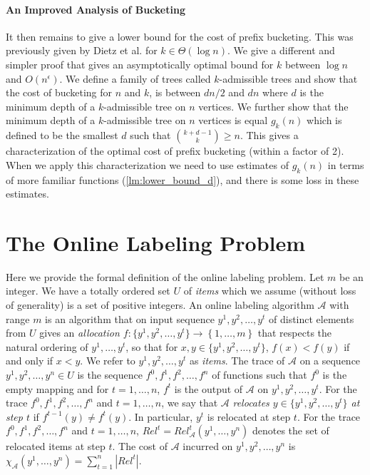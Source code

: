 \documentclass[unicode,review]{siamart1116}
\newcommand{\A}{\mathcal{A}}
\newcommand{\natInt}[2]{ \left\{ #1, \dotsc, #2 \right\} }
\numberwithin{theorem}{section}
\begin{document}
\paragraph{An Improved Analysis of Bucketing}

It then remains to give a lower bound
for the cost of prefix bucketing.  This was previously given by Dietz et al. \cite{DSZ04} for $k\in \Theta(\log n)$.
We give a different and simpler proof that gives an asymptotically optimal bound for $k$ between $\log n$ and $O(n^\epsilon)$.
We define a family of trees called $k$-admissible trees and show that the cost
of bucketing  for $n$ and $k$, is between $dn/2$ and $dn$ where $d$ is the minimum depth of a $k$-admissible tree
on $n$ vertices.  We further show that the minimum depth of a $k$-admissible tree on $n$ vertices
is equal $g_k(n)$ which is defined to be the smallest $d$ such that $\binom{k+d-1}{k} \geq n$.
This gives a  characterization of the optimal cost of prefix bucketing (within a factor of 2).  When we apply
this characterization we need to use estimates of $g_k(n)$ in terms of more familiar functions (\cref{lm:lower_bound_d}),
and there is some loss in these estimates.

\section{The Online Labeling Problem}\label{s-olp}

Here we provide the formal definition of the online labeling problem.
Let $m$ be an integer. We have a totally ordered set $U$ of {\em items} which we assume (without loss of generality) is
a set of positive integers. 
An online labeling algorithm $\A$ with range $m$ is an algorithm that on input sequence $y^1,y^2,\dotsc,y^t$ of distinct elements
from $U$ gives
an \emph{allocation $f : \{y^1,y^2,\dotsc,y^t\} \rightarrow \natInt{1}{m}$} that respects the natural ordering of $y^1,\dotsc,y^t$, so that
for $x,y\in \{y^1,y^2,\dotsc,y^t\}$, $f(x) < f(y)$ if and only if $x < y$. We refer to $y^1,y^2,\dotsc,y^t$
as \emph{items}. The trace of $\A$ on a sequence $y^1,y^2,\dotsc,y^n\in U$ is the sequence $f^0,f^1,f^2,\dotsc,f^n$ of functions
such that $f^0$ is the empty mapping and for $t=1,\dotsc,n$, $f^t$ is the output of $\A$ on $y^1,y^2,\dotsc,y^t$.
For the trace $f^0,f^1,f^2,\dotsc,f^n$ and $t=1,\dotsc,n$, we say that $\A$ \emph{relocates $y\in \{y^1,y^2,\dotsc,y^t\}$ at step $t$}
if $f^{t-1}(y)\not=f^t(y)$. In particular, $y^t$ is relocated at step $t$.
For the trace $f^0,f^1,f^2,\dotsc,f^n$ and $t=1,\dotsc,n$, $Rel^t=Rel^t_\A(y^1,\ldots,y^n)$  denotes the set of relocated items at step $t$.
The cost of $\A$ incurred on $y^1,y^2,\dotsc,y^n$ is $\chi_\A(y^1,\dotsc,y^n)=\sum_{t=1}^n |Rel^t|$. 
\end{document}
